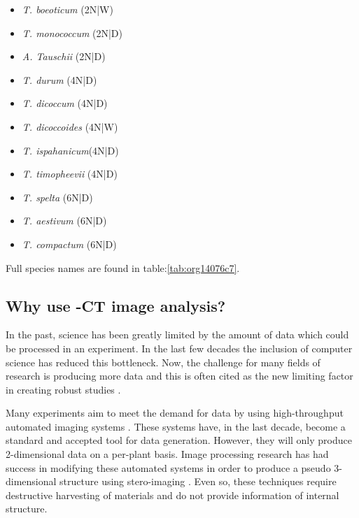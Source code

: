 \documentclass[11pt]{report}
\begin{document}
\begin{multicols}{3}

  \begin{itemize}
  \item{\textit{T. boeoticum} (2N|W)}
  \item{\textit{T. monococcum} (2N|D)}
  \item{\textit{A. Tauschii} (2N|D)}
  \end{itemize}

  \columnbreak

  \begin{itemize}
  \item{\textit{T. durum} (4N|D)}
  \item{\textit{T. dicoccum} (4N|D)}
  \item{\textit{T. dicoccoides} (4N|W)}
  \item{\textit{T. ispahanicum}(4N|D)}
  \item{\textit{T. timopheevii} (4N|D)}
  \end{itemize}

  \columnbreak

  \begin{itemize}
  \item{\textit{T. spelta} (6N|D)}
  \item{\textit{T. aestivum} (6N|D)}
  \item{\textit{T. compactum} (6N|D)}
  \end{itemize}

\end{multicols}
Full species names are found in table:\ref{tab:org14076c7}.

\subsection{Why use \textmu{}-CT image analysis?}
\label{sec:orgc676aac}
In the past, science has been greatly limited by the amount of data which could be processed in an experiment. In the last few decades the inclusion of computer science has reduced this bottleneck. Now, the challenge for many fields of research is producing more data and this is often cited as the new limiting factor in creating robust studies \cite{Furbank2011}.

Many experiments aim to meet the demand for data by using high-throughput automated imaging systems \cite{Naumann2007,Prasanna2013,Humplik2015}. These systems have, in the last decade, become a standard and accepted tool for data generation. However, they will only produce 2-dimensional data on a per-plant basis. Image processing research has had success in modifying these automated systems in order to produce a pseudo 3-dimensional structure using stero-imaging \cite{Roussel2016}. Even so, these techniques require destructive harvesting of materials and do not provide information of internal structure.
\end{document}
